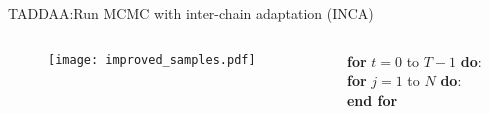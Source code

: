 \documentclass[10pt,xcolor=table]{beamer}
\begin{document}
\begin{frame}{TADDAA:Run MCMC with inter-chain adaptation (INCA)}
  \begin{columns}
  \begin{column}{0.5\linewidth}
\begin{figure}
  \begin{center}
    \texttt{[image: improved\_samples.pdf]}
  \end{center}
\end{figure}
  \end{column}
  \begin{column}{0.6 \linewidth}
        \textbf{\quad for} $t=0$ to $T-1$ \textbf{do}:\\
        \textbf{\quad\qquad for} $j=1$ to $N$ \textbf{do}:
        \\
        \textbf{\quad\qquad end for}\\
        \\
  \end{column}
  \end{columns}
\end{frame}
\end{document}
